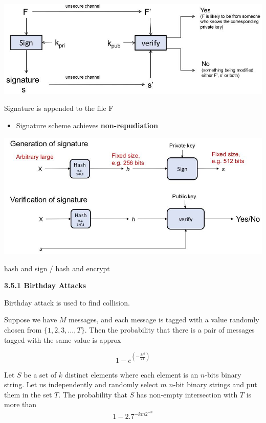 \documentclass[landscape,a4paper]{extarticle}
\newenvironment{Figure}
  {\par\noindent\minipage{\linewidth}}
  {\endminipage\par\medskip}
\begin{document}
\begin{multicols*}{5}
    \begin{Figure}
        \centering
        \includegraphics[width=\linewidth]{signature.jpg}
    \end{Figure}
    Signature is appended to the file F
    \begin{itemize}
        \item Signature scheme achieves \textbf{non-repudiation}
    \end{itemize}
    \begin{Figure}
        \centering
        \includegraphics[width=\linewidth]{signature_generation_verification.jpg}
    \end{Figure}
    hash and sign / hash and encrypt

    \textbf{3.5.1 Birthday Attacks}

    Birthday attack is used to find collision. 

    Suppose we have $M$ messages, and each message is tagged with a value randomly chosen from $\{1,2,3, \ldots, T\}$.
    Then the probability that there is a pair of messages tagged with the same value is approx

    \begin{equation*}
        1-e^{\left(-\frac{M^2}{2T}\right)}
    \end{equation*}

    Let $S$ be a set of $k$ distinct elements where each element is an $n$-bits binary
    string. Let us independently and randomly select $m$ $n$-bit binary strings and put
    them in the set $T$. The probability that $S$ has non-empty intersection with $T$ is
    more than
    \begin{align*}
        1 - 2.7^{-km2^{-n}}
    \end{align*}

\end{multicols*}
\end{document}
